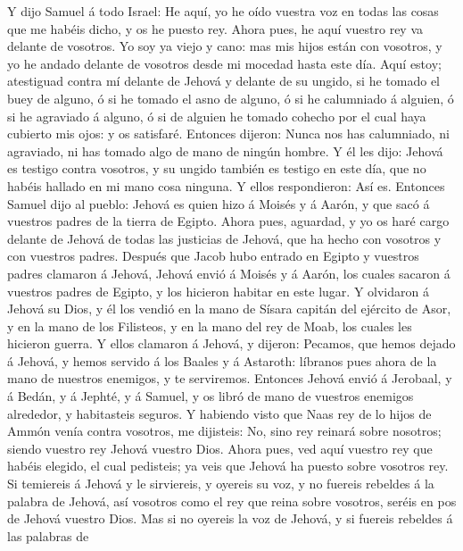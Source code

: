  Y dijo Samuel á todo Israel: He aquí, yo he oído vuestra
voz en todas las cosas que me habéis dicho, y os he puesto rey.
 Ahora pues, he aquí vuestro rey va delante de vosotros. Yo
soy ya viejo y cano: mas mis hijos están con vosotros, y yo he andado
delante de vosotros desde mi mocedad hasta este día.  Aquí
estoy; atestiguad contra mí delante de Jehová y delante de su ungido, si
he tomado el buey de alguno, ó si he tomado el asno de alguno, ó si he
calumniado á alguien, ó si he agraviado á alguno, ó si de alguien he
tomado cohecho por el cual haya cubierto mis ojos: y os satisfaré.
 Entonces dijeron: Nunca nos has calumniado, ni agraviado,
ni has tomado algo de mano de ningún hombre.  Y él les dijo:
Jehová es testigo contra vosotros, y su ungido también es testigo en
este día, que no habéis hallado en mi mano cosa ninguna. Y ellos
respondieron: Así es.  Entonces Samuel dijo al pueblo:
Jehová es quien hizo á Moisés y á Aarón, y que sacó á vuestros padres de
la tierra de Egipto.  Ahora pues, aguardad, y yo os haré
cargo delante de Jehová de todas las justicias de Jehová, que ha hecho
con vosotros y con vuestros padres.  Después que Jacob hubo
entrado en Egipto y vuestros padres clamaron á Jehová, Jehová envió á
Moisés y á Aarón, los cuales sacaron á vuestros padres de Egipto, y los
hicieron habitar en este lugar.  Y olvidaron á Jehová su
Dios, y él los vendió en la mano de Sísara capitán del ejército de Asor,
y en la mano de los Filisteos, y en la mano del rey de Moab, los cuales
les hicieron guerra.  Y ellos clamaron á Jehová, y dijeron:
Pecamos, que hemos dejado á Jehová, y hemos servido á los Baales y á
Astaroth: líbranos pues ahora de la mano de nuestros enemigos, y te
serviremos.  Entonces Jehová envió á Jerobaal, y á Bedán, y
á Jephté, y á Samuel, y os libró de mano de vuestros enemigos alrededor,
y habitasteis seguros.  Y habiendo visto que Naas rey de lo
hijos de Ammón venía contra vosotros, me dijisteis: No, sino rey reinará
sobre nosotros; siendo vuestro rey Jehová vuestro Dios. 
Ahora pues, ved aquí vuestro rey que habéis elegido, el cual pedisteis;
ya veis que Jehová ha puesto sobre vosotros rey.  Si
temiereis á Jehová y le sirviereis, y oyereis su voz, y no fuereis
rebeldes á la palabra de Jehová, así vosotros como el rey que reina
sobre vosotros, seréis en pos de Jehová vuestro Dios.  Mas
si no oyereis la voz de Jehová, y si fuereis rebeldes á las palabras de
